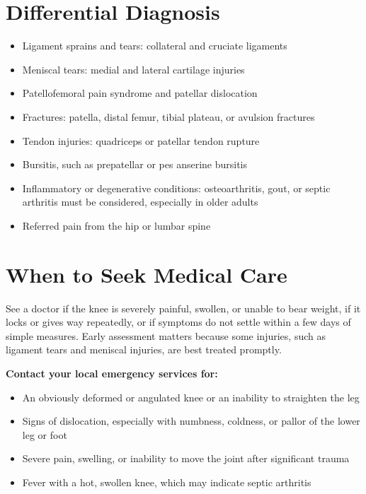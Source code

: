 \section*{Differential Diagnosis}
\begin{itemize}
    \item Ligament sprains and tears: collateral and cruciate ligaments
    \item Meniscal tears: medial and lateral cartilage injuries
    \item Patellofemoral pain syndrome and patellar dislocation
    \item Fractures: patella, distal femur, tibial plateau, or avulsion fractures
    \item Tendon injuries: quadriceps or patellar tendon rupture
    \item Bursitis, such as prepatellar or pes anserine bursitis
    \item Inflammatory or degenerative conditions: osteoarthritis, gout, or septic arthritis must be considered, especially in older adults
    \item Referred pain from the hip or lumbar spine
\end{itemize}

\section*{When to Seek Medical Care}
See a doctor if the knee is severely painful, swollen, or unable to bear weight, if it locks or gives way repeatedly, or if symptoms do not settle within a few days of simple measures. Early assessment matters because some injuries, such as ligament tears and meniscal injuries, are best treated promptly.

\textbf{Contact your local emergency services for:}
\begin{itemize}
    \item An obviously deformed or angulated knee or an inability to straighten the leg
    \item Signs of dislocation, especially with numbness, coldness, or pallor of the lower leg or foot
    \item Severe pain, swelling, or inability to move the joint after significant trauma
    \item Fever with a hot, swollen knee, which may indicate septic arthritis
\end{itemize}

